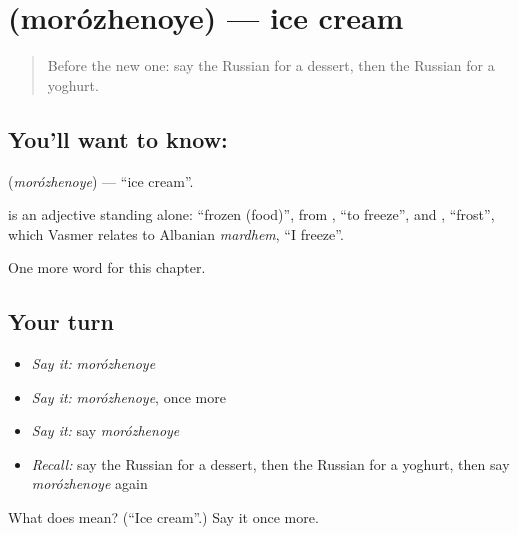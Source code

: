 \section[\texorpdfstring{\ru{мороженое} (morózhenoye)}{мороженое (morózhenoye)}]{ (morózhenoye) — ice cream}

\label{lesson:RU-C106-ice-cream}



\begin{quote}
Before the new one: say the Russian for a dessert, then the Russian for a yoghurt.
\end{quote}

\subsection*{You'll want to know: }
\textbf{} (\emph{morózhenoye}) — \textquotedblleft{}ice cream\textquotedblright{}.

\begin{cousinweb}
\textbf{} is an adjective standing alone: \textquotedblleft{}frozen (food)\textquotedblright{}, from \emph{}, \textquotedblleft{}to freeze\textquotedblright{}, and \emph{}, \textquotedblleft{}frost\textquotedblright{}, which Vasmer relates to Albanian \emph{mardhem}, \textquotedblleft{}I freeze\textquotedblright{}.
\end{cousinweb}

\begin{grammarlens}[title={What you've built}]
One more word for this chapter.
\end{grammarlens}

\subsection*{Your turn}
\begin{itemize}
\raggedright
  \item \emph{Say it:} \emph{morózhenoye}
  \item \emph{Say it:} \emph{morózhenoye}, once more
  \item \emph{Say it:} say \emph{morózhenoye}
  \item \emph{Recall:} say the Russian for a dessert, then the Russian for a yoghurt, then say \emph{morózhenoye} again
\end{itemize}

\begin{tcolorbox}[breakable,colback=teal!4,colframe=teal!35!black,title={Before you move on}]
What does  mean? (\textquotedblleft{}Ice cream\textquotedblright{}.) Say it once more.
\end{tcolorbox}
